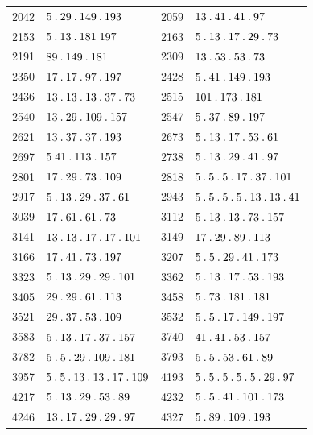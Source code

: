 \begin{longtable}{@{}r|l@{\qquad}r|l@{}}
2042 & $5\mathbin{.} 29\mathbin{.} 149\mathbin{.} 193$ & 2059 & $13\mathbin{.} 41\mathbin{.} 41\mathbin{.} 97$\\
2153 & $5\mathbin{.} 13\mathbin{.} 181\;197$ & 2163 & $5\mathbin{.} 13\mathbin{.} 17\mathbin{.} 29\mathbin{.} 73$\\
2191 & $89\mathbin{.} 149\mathbin{.} 181$ & 2309 & $13\mathbin{.} 53\mathbin{.} 53\mathbin{.} 73$\\
2350 & $17\mathbin{.} 17\mathbin{.} 97\mathbin{.} 197$ & 2428 & $5\mathbin{.} 41\mathbin{.} 149\mathbin{.} 193$\\
2436 & $13\mathbin{.} 13\mathbin{.} 13\mathbin{.} 37\mathbin{.} 73$ & 2515 & $101\mathbin{.} 173\mathbin{.} 181$\\
2540 & $13\mathbin{.} 29\mathbin{.} 109\mathbin{.} 157$ & 2547 & $5\mathbin{.} 37\mathbin{.} 89\mathbin{.} 197$\\
2621 & $13\mathbin{.} 37\mathbin{.} 37\mathbin{.} 193$ & 2673 & $5\mathbin{.} 13\mathbin{.} 17\mathbin{.} 53\mathbin{.} 61$\\
2697 & $5\;41\mathbin{.} 113\mathbin{.} 157$ & 2738 & $5\mathbin{.} 13\mathbin{.} 29\mathbin{.} 41\mathbin{.} 97$\\
2801 & $17\mathbin{.} 29\mathbin{.} 73\mathbin{.} 109$ & 2818 & $5\mathbin{.} 5\mathbin{.} 5\mathbin{.} 17\mathbin{.} 37\mathbin{.} 101$\\
2917 & $5\mathbin{.} 13\mathbin{.} 29\mathbin{.} 37\mathbin{.} 61$ & 2943 & $5\mathbin{.} 5\mathbin{.} 5\mathbin{.} 5\mathbin{.} 13\mathbin{.} 13\mathbin{.} 41$\\
3039 & $17\mathbin{.} 61\mathbin{.} 61\mathbin{.} 73$ & 3112 & $5\mathbin{.} 13\mathbin{.} 13\mathbin{.} 73\mathbin{.} 157$\\
3141 & $13\mathbin{.} 13\mathbin{.} 17\mathbin{.} 17\mathbin{.} 101$ & 3149 & $17\mathbin{.} 29\mathbin{.} 89\mathbin{.} 113$\\
3166 & $17\mathbin{.} 41\mathbin{.} 73\mathbin{.} 197$ & 3207 & $5\mathbin{.} 5\mathbin{.} 29\mathbin{.} 41\mathbin{.} 173$\\
3323 & $5\mathbin{.} 13\mathbin{.} 29\mathbin{.} 29\mathbin{.} 101$ & 3362 & $5\mathbin{.} 13\mathbin{.} 17\mathbin{.} 53\mathbin{.} 193$\\
3405 & $29\mathbin{.} 29\mathbin{.} 61\mathbin{.} 113$ & 3458 & $5\mathbin{.} 73\mathbin{.} 181\mathbin{.} 181$\\
3521 & $29\mathbin{.} 37\mathbin{.} 53\mathbin{.} 109$ & 3532 & $5\mathbin{.} 5\mathbin{.} 17\mathbin{.} 149\mathbin{.} 197$\\
3583 & $5\mathbin{.} 13\mathbin{.} 17\mathbin{.} 37\mathbin{.} 157$ & 3740 & $41\mathbin{.} 41\mathbin{.} 53\mathbin{.} 157$\\
3782 & $5\mathbin{.} 5\mathbin{.} 29\mathbin{.} 109\mathbin{.} 181$ & 3793 & $5\mathbin{.} 5\mathbin{.} 53\mathbin{.} 61\mathbin{.} 89$\\
3957 & $5\mathbin{.} 5\mathbin{.} 13\mathbin{.} 13\mathbin{.} 17\mathbin{.} 109$ & 4193 & $5\mathbin{.} 5\mathbin{.} 5\mathbin{.} 5\mathbin{.} 5\mathbin{.} 29\mathbin{.} 97$\\
4217 & $5\mathbin{.} 13\mathbin{.} 29\mathbin{.} 53\mathbin{.} 89$ & 4232 & $5\mathbin{.} 5\mathbin{.} 41\mathbin{.} 101\mathbin{.} 173$\\
4246 & $13\mathbin{.} 17\mathbin{.} 29\mathbin{.} 29\mathbin{.} 97$ & 4327 & $5\mathbin{.} 89\mathbin{.} 109\mathbin{.} 193$\\

\end{longtable}
